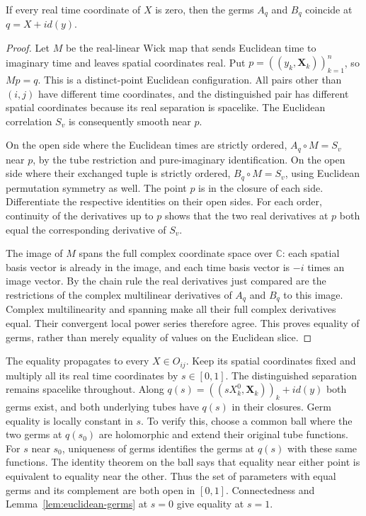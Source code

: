 \begin{lemma}\label{lem:euclidean-germs}
If every real time coordinate of $X$ is zero, then the germs $A_q$ and
$B_q$ coincide at $q=X+i d(y)$.
\end{lemma}
\begin{proof}
Let $M$ be the real-linear Wick map that sends Euclidean time to imaginary
time and leaves spatial coordinates real. Put
$p=((y_k,\mathbf X_k))_{k=1}^n$, so $Mp=q$.
This is a distinct-point Euclidean configuration. All pairs other than
$(i,j)$ have different time coordinates, and the distinguished pair has
different spatial coordinates because its real separation is spacelike.
The Euclidean correlation $S_v$ is consequently smooth near $p$.

On the open side where the Euclidean times are strictly ordered,
$A_q\circ M=S_v$ near $p$, by the tube restriction and pure-imaginary
identification. On the open side where their exchanged tuple is strictly
ordered, $B_q\circ M=S_v$, using Euclidean permutation symmetry as well.
The point $p$ is in the closure of each side. Differentiate the respective
identities on their open sides. For each order, continuity of the
derivatives up to $p$ shows that the two real derivatives at $p$ both
equal the corresponding derivative of $S_v$.

The image of $M$ spans the full complex coordinate space over $\mathbb C$:
each spatial basis vector is already in the image, and each time basis
vector is $-i$ times an image vector. By the chain rule the real derivatives
just compared are the restrictions of the complex multilinear derivatives
of $A_q$ and $B_q$ to this image. Complex multilinearity and spanning make
all their full complex derivatives equal. Their convergent local power
series therefore agree. This proves equality of germs, rather than merely
equality of values on the Euclidean slice.
\end{proof}

The equality propagates to every $X\in O_{ij}$. Keep its spatial coordinates
fixed and multiply all its real time coordinates by $s\in[0,1]$.
The distinguished separation remains spacelike throughout. Along
$q(s)=((sX_k^0,\mathbf X_k))_k+i d(y)$ both germs exist, and both
underlying tubes have $q(s)$ in their closures.
Germ equality is locally constant in $s$. To verify this, choose a common
ball where the two germs at $q(s_0)$ are holomorphic and extend their
original tube functions. For $s$ near $s_0$, uniqueness of germs identifies
the germs at $q(s)$ with these same functions. The identity theorem on
the ball says that equality near either point is equivalent to equality
near the other. Thus the set of parameters with equal germs and its
complement are both open in $[0,1]$. Connectedness and
Lemma~\ref{lem:euclidean-germs} at $s=0$ give equality at $s=1$.

